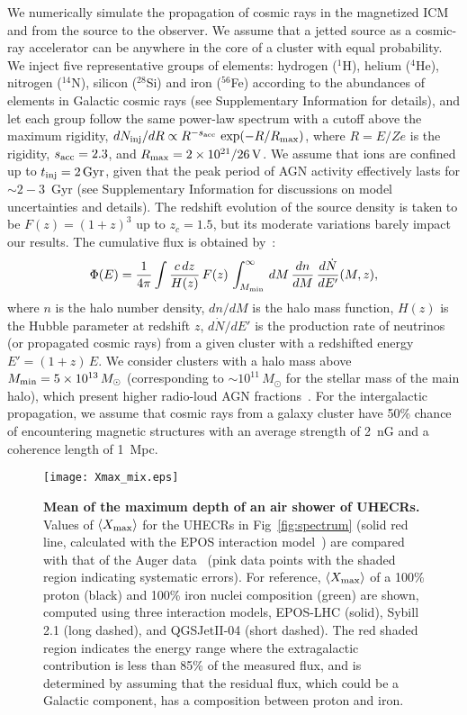 \documentclass[aps,prd,onecolumn,superscriptaddress,11pt]{revtex4}
\begin{document}
We numerically simulate the propagation of cosmic rays in the magnetized ICM and from the source to the observer. We assume that a jetted source as a cosmic-ray accelerator can be anywhere in the core of a cluster with equal probability. We inject five representative groups of elements: hydrogen ($^1$H), helium ($^4$He), nitrogen ($^{14}$N), silicon ($^{28}$Si) and iron ($^{56}$Fe) according to the abundances of elements in Galactic cosmic rays (see Supplementary Information for details), and let each group follow the same power-law spectrum with a cutoff above the maximum rigidity, $dN_{\rm inj}/dR\propto R^{-s_{\rm acc}}\,\exp(-R/R_{\rm max})$, where $R=E/Ze$ is the rigidity, $s_{\rm acc}=2.3$, and $R_{\rm max}=2\times10^{21}/26\,{\rm V}$. We assume that ions are confined up to $t_{\rm inj}= 2\,\rm Gyr$, given that the peak period of AGN activity effectively lasts for $\sim2-3$~Gyr (see Supplementary Information for discussions on model uncertainties and details). 
The redshift evolution of the source density is taken to be $F(z)=(1+z)^{3}$ up to $z_{c}=1.5$, but its moderate variations barely impact our results. The cumulative flux is obtained by~\cite{Murase:2008yt}:
\begin{equation}
\Phi(E)= \frac{1}{4\pi} \int\frac{c\,dz}{H(z)}\,F(z)\, \int_{M_{\rm min}}^{\infty}\,dM\,\frac{dn}{dM}\,\frac{d\dot{N}}{dE'}(M,z),
\end{equation}
where $n$ is the halo number density, $dn/dM$ is the halo mass function, $H(z)$ is the Hubble parameter at redshift $z$, $d\dot{N}/dE'$ is the production rate of neutrinos (or propagated cosmic rays) from a given cluster with a redshifted energy $E'=(1+z)\,E$. 
We consider clusters with a halo mass above $M_{\rm min} = 5\times10^{13}\,M_\odot$ (corresponding to $\sim10^{11}\,M_\odot$ for the stellar mass of the main halo), which present higher radio-loud AGN fractions~\cite{2007MNRAS.379..894B}. 
For the intergalactic propagation, we assume that cosmic rays from a galaxy cluster have 50\% chance of encountering magnetic structures with an average strength of 2~nG and a coherence length of 1~Mpc.

\begin{figure}
\centering\texttt{[image: Xmax\_mix.eps]}
\caption{\label{fig:Xmax}  \small {\bf Mean of the maximum depth of an air shower of UHECRs.} Values of $\langle X_{\rm max} \rangle$ for the UHECRs in Fig~\ref{fig:spectrum} (solid red line, calculated with the EPOS interaction model~\cite{2013JCAP...07..050D}) are compared with that of the Auger data~\cite{Aab:2015bza} (pink data points with the shaded region indicating systematic errors).  
For reference, $\langle X_{\rm max} \rangle$ of a 100\% proton (black) and 100\% iron nuclei composition (green) are shown, computed using three interaction models, EPOS-LHC (solid), Sybill 2.1 (long dashed), and QGSJetII-04 (short dashed). The red shaded region indicates the energy range where the extragalactic contribution is less than 85\% of the measured flux, and is determined by assuming that the residual flux, which could be a Galactic component, has a composition between proton and iron.}
\end{figure}
 
\end{document}
